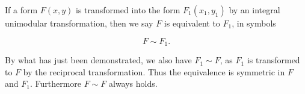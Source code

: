 If a form $F(x, y)$ is transformed into the form $F_1(x_1, y_1)$ by an integral unimodular transformation, then we say $F$ is equivalent to $F_1$, in symbols

$$F \sim F_1.$$

By what has just been demonstrated, we also have $F_1 \sim F$, as $F_1$ is transformed to $F$ by the reciprocal transformation. Thus the equivalence is symmetric in $F$ and $F_1$. Furthermore $F \sim F$ always holds.
